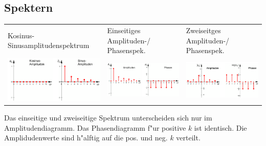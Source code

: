    \subsection{Spektern}
   	\begin{tabular}{p{6cm} p{6cm} p{6cm}}
   		Kosinus- Sinusamplitudenspektrum & 
   		Einseitiges Amplituden-/ Phasenspek. &
   		Zweiseitges Amplituden-/ Phasenspek. \\
   		\includegraphics[width=5cm]{Content/03_transforms/cosSinSpectr.png} &
   		\includegraphics[width=5cm]{Content/03_transforms/EinseitigSpectr.png} &
   		\includegraphics[width=5cm]{Content/03_transforms/ZweiseitigSpectr.png}
   	\end{tabular}
   	Das einseitige und zweiseitige Spektrum unterscheiden sich nur im
  	Amplitudendiagramm. Das Phasendiagramm f"ur positive $k$ ist identisch. Die
  	Amplidudenwerte sind h"alftig auf die pos. und neg. $k$ verteilt.
 